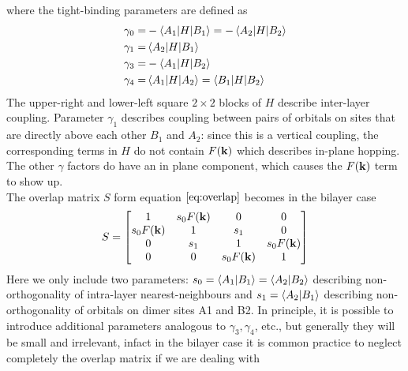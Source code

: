 where the tight-binding parameters are defined as 
\begin{equation}
    \begin{split}
        \gamma_0=&-\braket{A_1|H}{B_1}=-\braket{A_2|H}{B_2} \\
        \gamma_1=&\braket{A_2|H}{B_1}  \\
        \gamma_3=&-\braket{A_1|H}{B_2}  \\
        \gamma_4=& \braket{A_1|H}{A_2}=\braket{B_1|H}{B_2} \\
    \end{split}
\end{equation}
The upper-right and lower-left square $2\times 2$ blocks of $H$ describe inter-layer coupling. Parameter $\gamma_1$ describes coupling between pairs of orbitals on sites that are directly above each other $B_1$ and $A_2$: since this is a vertical coupling, the corresponding terms in $H$ do not contain $F(\mathbf{k})$ which describes in-plane hopping. The other $\gamma$ factors do have an in plane component, which causes the $F(\mathbf{k})$ term to show up.\\
The overlap matrix $S$ form equation $\ref{eq:overlap}$ becomes in the bilayer case
\begin{equation}
    S=
    \begin{bmatrix}
        1 & s_0 F(\mathbf{k}) & 0&0\\
        s_0 F(\mathbf{k})  &1&s_1&0\\
        0&s_1&1&s_0 F(\mathbf{k})\\
        0&0&s_0 F(\mathbf{k}) &1
    \end{bmatrix}
\end{equation}
Here we only include two parameters: $s_0 = \braket{A_1}{B_1} = \braket{A_2}{B_2}$ describing non-orthogonality of intra-layer nearest-neighbours and $s_1= \braket{A_2}{B_1}$ describing non-orthogonality of orbitals on dimer sites A1 and B2. In principle, it is possible to introduce additional parameters analogous to $\gamma_3,\gamma_4$, etc., but generally they will be small and irrelevant, infact in the bilayer case it is common practice to neglect completely the overlap matrix if we are dealing with 